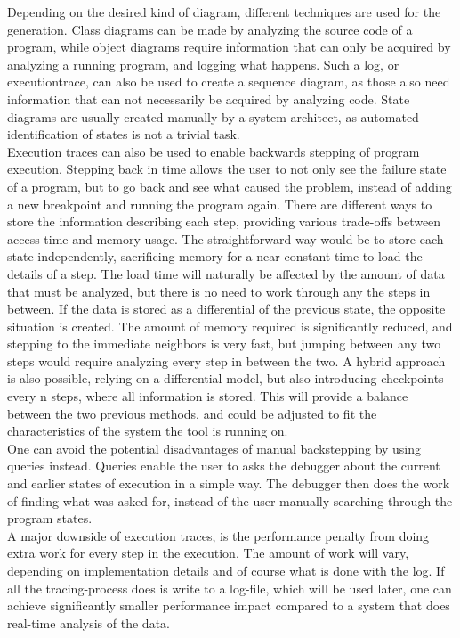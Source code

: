 Depending on the desired kind of diagram, different techniques are used for the generation.
Class diagrams can be made by analyzing the source code of a program, while object diagrams require information that can only be acquired by analyzing a running program, and logging what happens.
Such a log, or \gls{executiontrace}, can also be used to create a sequence diagram, as those also need information that can not necessarily be acquired by analyzing code.
State diagrams are usually created manually by a system architect, as automated identification of states is not a trivial task.
~\\

Execution traces can also be used to enable backwards stepping of program execution.
Stepping back in time allows the user to not only see the failure state of a program, but to go back and see what caused the problem, instead of adding a new \gls{breakpoint} and running the program again.
There are different ways to store the information describing each step, providing various trade-offs between access-time and memory usage.
The straightforward way would be to store each state independently, sacrificing memory for a near-constant time to load the details of a step.
The load time will naturally be affected by the amount of data that must be analyzed, but there is no need to work through any the steps in between.
If the data is stored as a differential of the previous state, the opposite situation is created.
The amount of memory required is significantly reduced, and stepping to the immediate neighbors is very fast, but jumping between any two steps would require analyzing every step in between the two.
A hybrid approach is also possible, relying on a differential model, but also introducing checkpoints every n steps, where all information is stored.
This will provide a balance between the two previous methods, and could be adjusted to fit the characteristics of the system the tool is running on.
~\\

One can avoid the potential disadvantages of manual backstepping by using queries instead.
Queries enable the user to asks the debugger about the current and earlier states of execution in a simple way.
The debugger then does the work of finding what was asked for, instead of the user manually searching through the program states.
~\\

A major downside of execution traces, is the performance penalty from doing extra work for every step in the execution.
The amount of work will vary, depending on implementation details and of course what is done with the log.
If all the tracing-process does is write to a log-file, which will be used later, one can achieve significantly smaller performance impact compared to a system that does real-time analysis of the data.
~\\

